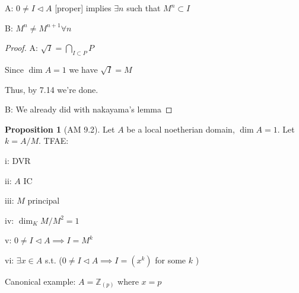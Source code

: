 \documentclass{article}
\theoremstyle{definition}
\newtheorem{proposition}{Proposition}
\begin{document}
A: \(0 \neq I \triangleleft A\) [proper] implies \(\exists n\) such that \(M^n \subset I\)

B: \(M^n \neq M^{n+1} \forall n\) 

\begin{proof}
    A: \(\sqrt{I} = \bigcap_{I \subset P} P\) 

    Since \(\dim A = 1\) we have \(\sqrt{I} = M\)
    
    Thus, by 7.14 we're done.

    B: We already did with nakayama's lemma


\end{proof}

\begin{proposition}
    [AM 9.2] Let \(A\) be a local noetherian domain, \(\dim A = 1\). Let \(k = A/M\). TFAE:
    
    i: DVR
    
    ii: \(A\) IC

    iii: \(M\) principal

    iv: \(\dim_K M / M^2 = 1\)
    
    v: \(0 \neq I \triangleleft A \implies I = M^k\)
    
    vi: \(\exists x\in A\) s.t. (\(0 \neq I \triangleleft A \implies I = (x^k)\) for some \(k\) )  
    
\end{proposition}

Canonical example: \(A = \mathbb{Z}_{(p)}\) where \(x = p\) 
\end{document}
